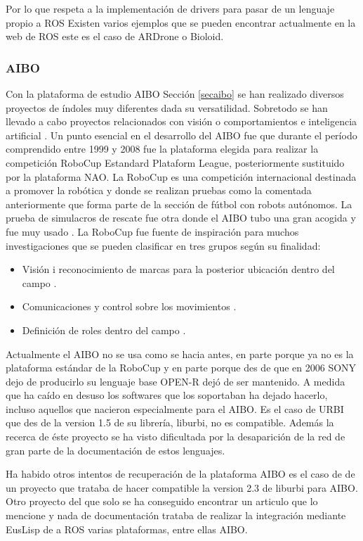 \documentclass[12pt,a4paper,final,twoside]{article}
\begin{document}
Por lo que respeta a la implementación de drivers para pasar de un lenguaje propio a ROS Existen varios ejemplos que se pueden encontrar actualmente en la web de ROS este es el caso de ARDrone o Bioloid. 

\subsubsection{AIBO}

Con la plataforma de estudio AIBO Sección \ref{secaibo} se han realizado diversos proyectos de índoles muy diferentes dada su versatilidad. Sobretodo se han llevado a cabo proyectos relacionados con visión \cite{xavi} o comportamientos e inteligencia artificial \cite{riki}.
Un punto esencial en el desarrollo del AIBO fue que durante el período comprendido entre 1999 y 2008 fue la plataforma elegida para realizar la competición RoboCup Estandard Plataform League, posteriormente sustituido por la plataforma NAO. La RoboCup es una competición internacional destinada a promover la robótica y donde se realizan pruebas como la comentada anteriormente que forma parte de la sección de fútbol con robots autónomos. La prueba de simulacros de rescate fue otra donde el AIBO tubo una gran acogida y fue muy usado \cite{robocup}.
La RoboCup fue fuente de inspiración para muchos investigaciones que se pueden clasificar en tres grupos según su finalidad:
\begin{itemize}
\item Visión i reconocimiento de marcas para la posterior ubicación dentro del campo \cite{morales}.
\item Comunicaciones y control sobre los movimientos \cite{jesus}.
\item Definición de roles dentro del campo \cite{metod}.
\end{itemize}

Actualmente el AIBO no se usa como se hacia antes, en parte porque ya no es la plataforma estándar de la RoboCup y en parte porque des de que en 2006 SONY dejo de producirlo su lenguaje base OPEN-R\cite{OPEN-R PG} dejó de ser mantenido.
A medida que ha caído en desuso los softwares que los soportaban ha dejado hacerlo, incluso aquellos que nacieron especialmente para el AIBO. Es el caso de URBI que des de la version 1.5 de su librería, liburbi, no es compatible.
Además la recerca de éste proyecto se ha visto dificultada por la desaparición de la red de gran parte de la documentación de estos lenguajes.

Ha habido otros intentos de recuperación de la plataforma AIBO es el caso de de un proyecto que trataba de hacer compatible la version 2.3 de liburbi para AIBO.%
Otro proyecto del que solo se ha conseguido encontrar un articulo que lo mencione y nada de documentación  trataba de realizar la integración mediante EusLisp de a ROS varias plataformas, entre ellas AIBO.%
\end{document}
